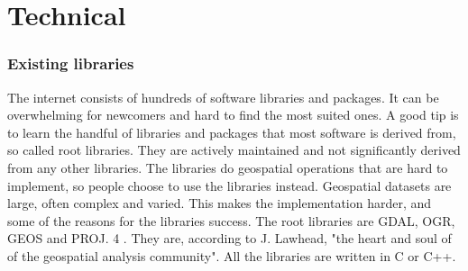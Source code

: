 \chapter{Technical}

\subsection{Existing libraries}
The internet consists of hundreds of software libraries and packages. It can be overwhelming for newcomers and hard to find the most suited ones. A good tip is to learn the handful of libraries and packages that most software is derived from, so called root libraries. They are actively maintained and not significantly derived from any other libraries. The libraries do geospatial operations that are hard to implement, so people choose to use the libraries instead. Geospatial datasets are large, often complex and varied. This makes the implementation harder, and some of the reasons for the libraries success. The root libraries are GDAL, OGR, GEOS and PROJ. 4 \cite{Lawhead2013}.  They are, according to J. Lawhead, "the heart and soul of of the geospatial analysis community". All the libraries are written in C or C++. 



